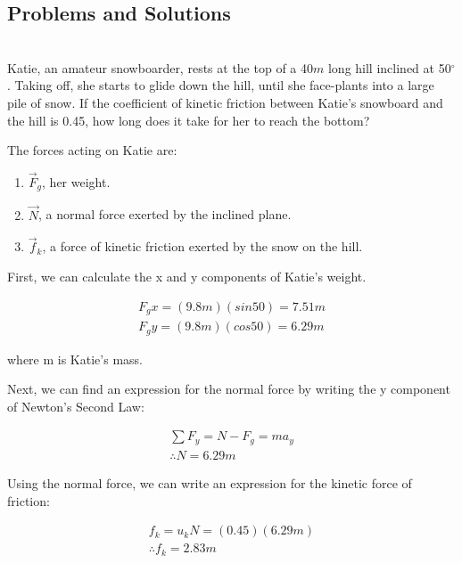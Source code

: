 \subsection{Problems and Solutions}
 \vspace{0.25cm}
\begin{problem}\\ Katie, an amateur snowboarder, rests at the top of a 40$m$ long hill inclined at 50$^{\circ}$. Taking off, she starts to glide down the hill, until she face-plants into a large pile of snow. If the coefficient of kinetic friction between Katie's snowboard and the hill is 0.45, how long does it take for her to reach the bottom?



The forces acting on Katie are:
\begin{enumerate}
\item $\vec F_g$, her weight.
\item $\vec N$, a normal force exerted by the inclined plane.
\item $\vec f_k$, a force of kinetic friction exerted by the snow on the hill. 
\end{enumerate}

First, we can calculate the x and y components of Katie's weight.

\begin{align*}
F_gx=(9.8m)(sin50) = 7.51m
\\F_gy=(9.8m)(cos50)= 6.29m
\end{align*}

where m is Katie's mass.

Next, we can find an expression for the normal force by writing the y component of Newton's Second Law:

\begin{align*}
\sum F_y=N-F_g=ma_y
\\\therefore N=6.29m
\end{align*}

Using the normal force, we can write an expression for the kinetic force of friction:

\begin{align*}
f_k=u_kN=(0.45)(6.29m)
\\\therefore f_k=2.83m
\end{align*}


\end{problem}
